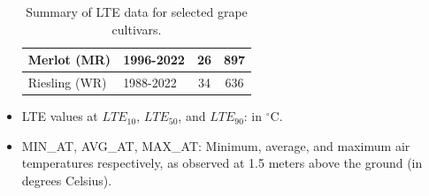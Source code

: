 \begin{itemize}
\begin{table}[th!]
{\begin{tabular}{ |l|l|c|c| }
Merlot (MR)	             &1996-2022	                                    &26                         &897 \\\hline
Riesling (WR)             &1988-2022	                                    &34                         &636 \\\hline
\end{tabular}
}
\caption{Summary of LTE data for selected grape cultivars.}
\label{tab:data-description}
\end{table}
\item LTE values at $LTE_{10}$, $LTE_{50}$, and $LTE_{90}$: in $^{\circ}$C. 
\item MIN\_AT, AVG\_AT, MAX\_AT: Minimum, average, and maximum air temperatures respectively, as observed at 1.5 meters above the ground (in degrees Celsius). 
\end{itemize}
